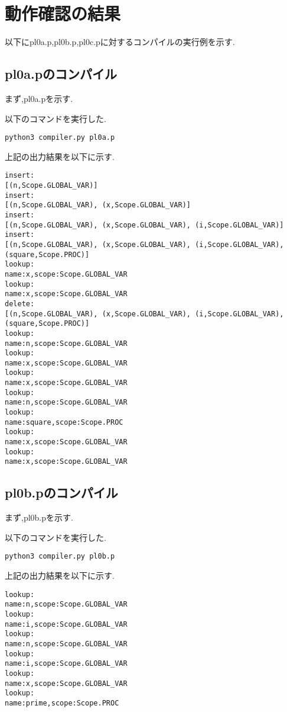 \documentclass[main]{subfiles}
\begin{document}
\section{動作確認の結果}
以下にpl0a.p,pl0b.p,pl0c.pに対するコンパイルの実行例を示す.
\subsection{pl0a.pのコンパイル}
まず,pl0a.pを示す.


以下のコマンドを実行した.
\begin{oframed}
\begin{verbatim}
python3 compiler.py pl0a.p
\end{verbatim}
\end{oframed}
上記の出力結果を以下に示す.
\begin{lstlisting}[caption=python3 compiler.py pl0a.pの出力]
insert:
[(n,Scope.GLOBAL_VAR)]
insert:
[(n,Scope.GLOBAL_VAR), (x,Scope.GLOBAL_VAR)]
insert:
[(n,Scope.GLOBAL_VAR), (x,Scope.GLOBAL_VAR), (i,Scope.GLOBAL_VAR)]
insert:
[(n,Scope.GLOBAL_VAR), (x,Scope.GLOBAL_VAR), (i,Scope.GLOBAL_VAR), (square,Scope.PROC)]
lookup:
name:x,scope:Scope.GLOBAL_VAR
lookup:
name:x,scope:Scope.GLOBAL_VAR
delete:
[(n,Scope.GLOBAL_VAR), (x,Scope.GLOBAL_VAR), (i,Scope.GLOBAL_VAR), (square,Scope.PROC)]
lookup:
name:n,scope:Scope.GLOBAL_VAR
lookup:
name:x,scope:Scope.GLOBAL_VAR
lookup:
name:x,scope:Scope.GLOBAL_VAR
lookup:
name:n,scope:Scope.GLOBAL_VAR
lookup:
name:square,scope:Scope.PROC
lookup:
name:x,scope:Scope.GLOBAL_VAR
lookup:
name:x,scope:Scope.GLOBAL_VAR
\end{lstlisting}

\subsection{pl0b.pのコンパイル}
まず,pl0b.pを示す.


以下のコマンドを実行した.
\begin{oframed}
\begin{verbatim}
python3 compiler.py pl0b.p
\end{verbatim}
\end{oframed}
上記の出力結果を以下に示す.
\begin{lstlisting}[caption=python3 compiler.py pl0c.pの出力]
lookup:
name:n,scope:Scope.GLOBAL_VAR
lookup:
name:i,scope:Scope.GLOBAL_VAR
lookup:
name:n,scope:Scope.GLOBAL_VAR
lookup:
name:i,scope:Scope.GLOBAL_VAR
lookup:
name:x,scope:Scope.GLOBAL_VAR
lookup:
name:prime,scope:Scope.PROC
\end{lstlisting}
\end{document}
